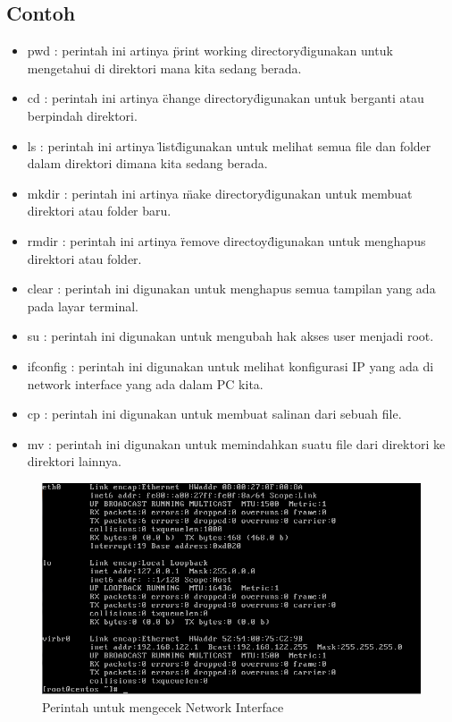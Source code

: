 		\subsection{Contoh}
		\begin{itemize}
			\item pwd : perintah ini artinya \"print working directory\" digunakan untuk mengetahui di direktori mana kita sedang berada.
			\item cd : perintah ini artinya \"change directory\" digunakan untuk berganti atau berpindah direktori.
			\item ls : perintah ini artinya \"list\" digunakan untuk melihat semua file dan folder dalam direktori dimana kita sedang berada.
			\item mkdir : perintah ini artinya \"make directory\" digunakan untuk membuat direktori atau folder baru.
			\item rmdir : perintah ini artinya \"remove directoy\" digunakan untuk menghapus direktori atau folder.
			\item clear : perintah ini digunakan untuk menghapus semua tampilan yang ada pada layar terminal.
			\item su : perintah ini digunakan untuk mengubah hak akses user menjadi root.
			\item ifconfig : perintah ini digunakan untuk melihat konfigurasi IP yang ada di network interface yang ada dalam PC kita.
			\item cp : perintah ini digunakan untuk membuat salinan dari sebuah file.
			\item mv : perintah ini digunakan untuk memindahkan suatu file dari direktori ke direktori lainnya.
		\end{itemize}
			\begin{figure}[ht]
			\centerline{\includegraphics[width=1\textwidth]{figures/ifconfig.png}}
			\caption{Perintah untuk mengecek Network Interface}
			\label{ifconfig}
			\end{figure}
			
